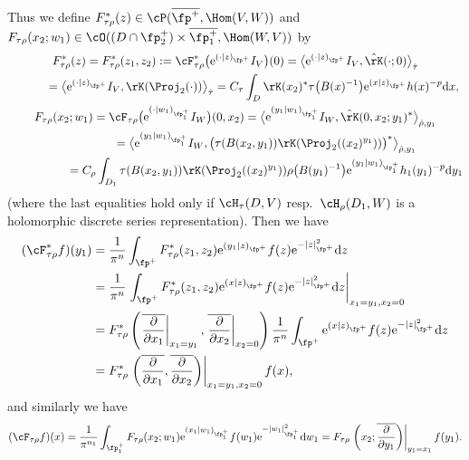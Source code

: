 Thus we define $F_{\tau\rho}^*(z)\in\cP(\overline{\fp^+},\Hom(V,W))$ and
$F_{\tau\rho}(x_2;w_1)\in\cO((D\cap\fp^+_2)\times\overline{\fp^+_1},\allowbreak\Hom(W,V))$ by
\begin{gather*}
F_{\tau\rho}^*(z)=F_{\tau\rho}^*(z_1,z_2):=\cF_{\tau\rho}^*\big({\rm e}^{(\cdot|z)_{\fp^+}}I_V\big)(0)
=\big\langle {\rm e}^{(\cdot|z)_{\fp^+}}I_V,\hat{\rK}(\cdot;0)\big\rangle_{\hat{\tau}} \\
\hphantom{F_{\tau\rho}^*(z)}{} =\big\langle {\rm e}^{(\cdot|z)_{\fp^+}}I_V,\rK(\Proj_2(\cdot))\big\rangle_{\hat{\tau}}
=C_\tau\int_D \rK(x_2)^*\tau\big(B(x)^{-1}\big){\rm e}^{(x|z)_{\fp^+}}h(x)^{-p}{\rm d}x,\\
F_{\tau\rho}(x_2;w_1)=\cF_{\tau\rho}\big({\rm e}^{(\cdot|w_1)_{\fp^+_1}}I_W\big)(0,x_2)
=\big\langle {\rm e}^{(y_1|w_1)_{\fp^+_1}}I_W,\hat{\rK}(0,x_2;y_1)^*\big\rangle_{\hat{\rho},y_1}\\
\hphantom{F_{\tau\rho}(x_2;w_1)}{}=\big\langle {\rm e}^{(y_1|w_1)_{\fp^+_1}}I_W,\bigl(\tau(B(x_2,y_1))\rK(\Proj_2((x_2)^{y_1}))\bigr)^*\big\rangle_{\hat{\rho},y_1}\\
\hphantom{F_{\tau\rho}(x_2;w_1)}{}=C_\rho\int_{D_1} \tau(B(x_2,y_1))\rK(\Proj_2((x_2)^{y_1}))\rho\big(B(y_1)^{-1}\big){\rm e}^{(y_1|w_1)_{\fp^+_1}}h_1(y_1)^{-p}{\rm d}y_1
\end{gather*}
(where the last equalities hold only if $\cH_\tau(D,V)$ resp.~$\cH_\rho(D_1,W)$ is a holomorphic discrete series representation).
Then we have
\begin{align*}
(\cF_{\tau\rho}^*f)(y_1)&=\frac{1}{\pi^n}\int_{\fp^+}F_{\tau\rho}^*(z_1,z_2){\rm e}^{(y_1|z)_{\fp^+}}f(z){\rm e}^{-|z|_{\fp^+}^2}{\rm d}z\\
&=\frac{1}{\pi^n}\left.\int_{\fp^+}F_{\tau\rho}^*(z_1,z_2){\rm e}^{(x|z)_{\fp^+}}f(z){\rm e}^{-|z|_{\fp^+}^2}{\rm d}z\right|_{x_1=y_1,x_2=0}\\
&=F_{\tau\rho}^*\left(\left.\overline{\frac{\partial}{\partial x_1}}\right|_{x_1=y_1},
\left.\overline{\frac{\partial}{\partial x_2}}\right|_{x_2=0}\right)
\frac{1}{\pi^n}\int_{\fp^+}{\rm e}^{(x|z)_{\fp^+}}f(z){\rm e}^{-|z|_{\fp^+}^2}{\rm d}z\\
&=F_{\tau\rho}^*\left.\left(\overline{\frac{\partial}{\partial x_1}},\overline{\frac{\partial}{\partial x_2}}\right)\right|_{x_1=y_1,x_2=0}f(x),
\end{align*}
and similarly we have
\begin{gather*}
(\cF_{\tau\rho}f)(x) =\frac{1}{\pi^{n_1}}\int_{\fp^+_1}F_{\tau\rho}(x_2;w_1){\rm e}^{(x_1|w_1)_{\fp^+_1}}f(w_1){\rm e}^{-|w_1|_{\fp^+_1}^2}{\rm d}w_1
=F_{\tau\rho}\left.\left(x_2;\overline{\frac{\partial}{\partial y_1}}\right)\right|_{y_1=x_1}f(y_1).
\end{gather*}

